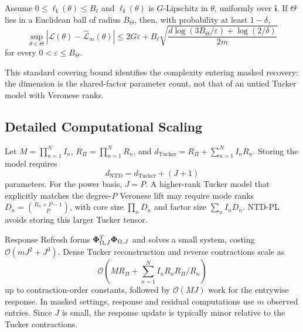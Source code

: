 \begin{theorem}
\label{thm:supp-masked-generalization}
Assume \(0\le \ell_{\mathbf{i}}(\theta)\le B_\ell\) and
\(\ell_{\mathbf{i}}(\theta)\) is \(G\)-Lipschitz in \(\theta\), uniformly over
\(\mathbf{i}\). If \(\Theta\) lies in a Euclidean ball of radius \(B_\Theta\),
then, with probability at least \(1-\delta\),
\begin{equation}
  \sup_{\theta\in\Theta}
  \left|
  \mathcal{L}(\theta)-\widehat{\mathcal{L}}_m(\theta)
  \right|
  \le
  2G\varepsilon
  +
  B_\ell
  \sqrt{
  \frac{
  d\log(3B_\Theta/\varepsilon)+\log(2/\delta)}
  {2m}}
\end{equation}
for every \(0<\varepsilon\le B_\Theta\).
\end{theorem}

This standard covering bound identifies the complexity entering masked
recovery: the dimension is the shared-factor parameter count, not
that of an untied Tucker model with Veronese ranks.

\subsection{Detailed Computational Scaling}

Let $M=\prod_{n=1}^{N}I_n$, $R_\Pi=\prod_{n=1}^{N}R_n$, and
$d_{\mathrm{Tucker}}=R_\Pi+\sum_{n=1}^{N}I_nR_n$. Storing the
model requires
\begin{equation}
  d_{\mathrm{NTD}}=d_{\mathrm{Tucker}}+(J+1)
\end{equation}
parameters. For the power basis, $J=P$. A higher-rank Tucker model that
explicitly matches the degree-$P$ Veronese lift may require mode ranks
$D_n=\binom{R_n+P-1}{P}$, with core size $\prod_nD_n$ and factor size
$\sum_nI_nD_n$. NTD-PL avoids storing this larger Tucker tensor.

Response Refresh forms $\boldsymbol{\Phi}_{\Omega,J}^{T}\boldsymbol{\Phi}_{\Omega,J}$ and solves a
small system, costing $\mathcal{O}(mJ^2+J^3)$. Dense Tucker reconstruction and
reverse contractions scale as
\begin{equation}
  \mathcal{O}\!\left(
  M R_\Pi + \sum_{n=1}^{N} I_n R_n R_\Pi/R_n
  \right)
\end{equation}
up to contraction-order constants, followed by $\mathcal{O}(MJ)$ work for the
entrywise response. In masked settings, response and residual computations use
$m$ observed entries. Since $J$ is small, the response update is typically
minor relative to the Tucker contractions.
